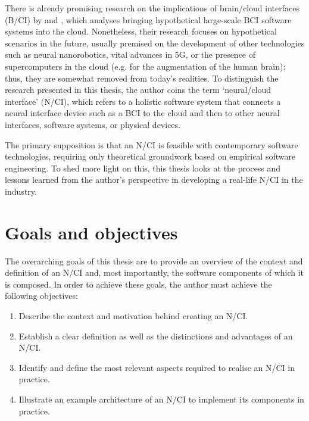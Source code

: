 There is already promising research on the implications of brain/cloud interfaces (B/CI) by \citeauthor{martins_human_2019} \parencite*{martins_human_2019} and \citeauthor{angelica_cognitive_2021} \parencite*{angelica_cognitive_2021}, which analyses bringing hypothetical large-scale BCI software systems into the cloud. Nonetheless, their research focuses on hypothetical scenarios in the future, usually premised on the development of other technologies such as neural nanorobotics, vital advances in 5G, or the presence of supercomputers in the cloud (e.g. for the augmentation of the human brain); thus, they are somewhat removed from today’s realities. To distinguish the research presented in this thesis, the author coins the term ‘neural/cloud interface’ (N/CI), which refers to a holistic software system that connects a neural interface device such as a BCI to the cloud and then to other neural interfaces, software systems, or physical devices.

The primary supposition is that an N/CI is feasible with contemporary software technologies, requiring only theoretical groundwork based on empirical software engineering. To shed more light on this, this thesis looks at the process and lessons learned from the author’s perspective in developing a real-life N/CI in the industry.

\section{Goals and objectives}
\label{chapter1-goals-and-objectives}

The overarching goals of this thesis are to provide an overview of the context and definition of an N/CI and, most importantly, the software components of which it is composed. In order to achieve these goals, the author must achieve the following objectives:

\begin{enumerate}
  \item Describe the context and motivation behind creating an N/CI.
  \item Establish a clear definition as well as the distinctions and advantages of an N/CI.
  \item Identify and define the most relevant aspects required to realise an N/CI in practice.
  \item Illustrate an example architecture of an N/CI to implement its components in practice.
\end{enumerate}

